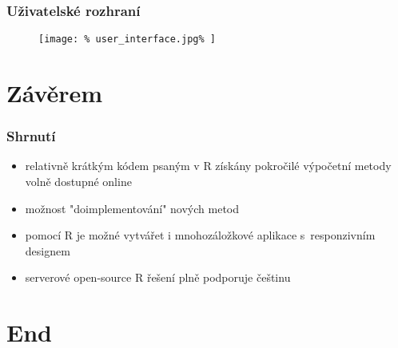 \documentclass[t, compress]{beamer}
\begin{document}

\begin{frame}
  \frametitle{%
    Uživatelské rozhraní%
  }  
  \vspace{-0.8cm}  
  \begin{figure}
    \texttt{[image: \%
      user\_interface.jpg\%
    ]}
  \end{figure}
\end{frame}



\section{Závěrem}


\begin{frame}
  \frametitle{%
    Shrnutí%
  }
  \begin{itemize}
    \item relativně krátkým kódem psaným v R získány pokročilé
    výpočetní metody volně dostupné online
    \item možnost "doimplementování" nových metod
    \item pomocí R je možné vytvářet i mnohozáložkové aplikace
    \mbox{s responzivním} designem
    \item serverové open-source R řešení plně podporuje češtinu
  \end{itemize}
\end{frame}



\section*{End}

\end{document}
